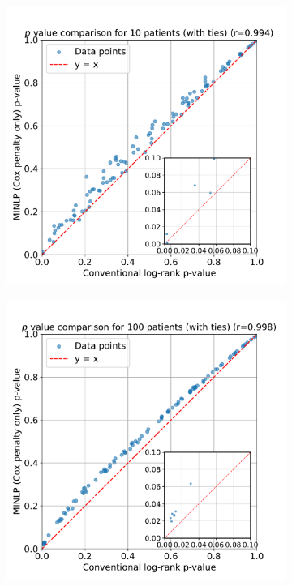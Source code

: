 \documentclass[article]{jss}
\begin{document}
\begin{figure}[ht]
\centering
\begin{subfigure}[t]{0.32\textwidth}
  \centering
  \includegraphics[width=\linewidth]{p_value_comparison_10_patients.pdf}
  \caption{\label{fig:compare-p-value-10-patients}}
\end{subfigure}
\begin{subfigure}[t]{0.32\textwidth}
  \centering
  \includegraphics[width=\linewidth]{p_value_comparison_100_patients.pdf}

\end{subfigure}
\end{figure}
\end{document}

